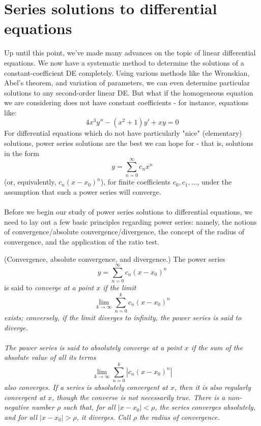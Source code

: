 \documentclass{article}
\begin{document}
\section{Series solutions to differential equations}
Up until this point, we've made many advances on the topic of linear differential equations. We now have a systematic method to determine the solutions of a constant-coefficient DE completely. Using various methods like the Wronskian, Abel's theorem, and variation of parameters, we can even determine particular solutions to any second-order linear DE. But what if the homogeneous equation we are considering does not have constant coefficients - for instance, equations like: 
\begin{equation*}
    4x^3y'' - (x^2+1)y' + xy = 0
\end{equation*}
For differential equations which do not have particularly "nice" (elementary) solutions, power series solutions are the best we can hope for - that is, solutions in the form
\begin{equation*}
    y=\sum_{n=0}^{\infty} c_n x^n
\end{equation*}
(or, equivalently, $c_n (x-x_0)^n$), for finite coefficients $c_0, c_1, \dots$, under the assumption that such a power series will converge. \\ \\
Before we begin our study of power series solutions to differential equations, we need to lay out a few basic principles regarding power series: namely, the notions of convergence/absolute convergence/divergence, the concept of the radius of convergence, and the application of the ratio test.
\begin{principle}
    (Convergence, absolute convergence, and divergence.) The power series
    \begin{equation*}
        y=\sum_{n=0}^{\infty} c_n (x-x_0)^n
    \end{equation*}
    is said to \it converge \normalfont at a point $x$ if the limit 
    \begin{equation*}
        \lim_{k\to\infty}\sum_{n=0}^{k} c_n (x-x_0)^n
    \end{equation*}
    exists; conversely, if the limit diverges to infinity, the power series is said to \it diverge.\normalfont \\ \\
    The power series is said to \it absolutely converge \normalfont at a point $x$ if the sum of the absolute value of all its terms 
    \begin{equation*}
        \lim_{k\to\infty}\sum_{n=0}^{k} |c_n (x-x_0)^n|
    \end{equation*}
    also converges. If a series is absolutely convergent at $x$, then it is also regularly convergent at $x$, though the converse is not necessarily true.
    There is a non-negative number $\rho$ such that, for all $|x-x_0|<\rho$, the series converges absolutely, and for all $|x-x_0|>\rho$, it diverges. Call $\rho$ the \it radius of convergence. \normalfont
\end{principle}
\end{document}

